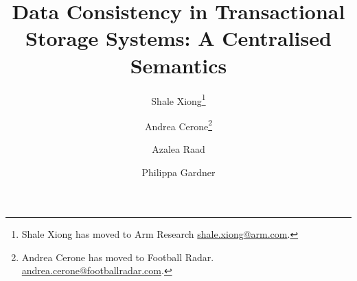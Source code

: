 \documentclass[a4paper,UKenglish,cleveref,autoref,thm-restate]{lipics-v2019}
\title{Data Consistency in Transactional Storage Systems: A Centralised Semantics}
\author{Shale Xiong\footnote{Shale Xiong has moved to Arm Research \url{shale.xiong@arm.com}.}}
       {Department of Computing, Imperial College London, UK}{shale.xiong14@ic.ac.uk}
       {[orcid]}
       {The Department of Computing, Imperial College London, and EPSRC Fellowship 'VeTSpec: Verified Trustworthy Software Specification' (EP/R034567/1)}
\author{Andrea Cerone\footnote{Andrea Cerone has moved to Football Radar. \url{andrea.cerone@footballradar.com}.}}
       {Department of Computing, Imperial College London, UK}
       {andrea.cerone@fic.ac.uk}
       {[orcid]}
       {EPSRC Programme Grant 'REMS: Rigorous Engineering for Mainstream Systems' (EP/K008528/1)}
\author{Azalea Raad}
       {MPI-SWS, Germany}
       {azalea@mpi-sws.org}
       {[orcid]}
       {[funding]}
\author{Philippa Gardner}
       {Department of Computing, Imperial College London, UK}
       {p.gardner@ic.ac.uk}
       {[orcid]}
       {EPSRC Programme Grant 'REMS: Rigorous Engineering for Mainstream Systems' (EP/K008528/1), and EPSRC Fellowship 'VeTSpec: Verified Trustworthy Software Specification' (EP/R034567/1)}
\newcommand{\RootPath}{.}
\begin{document}
\maketitle

\begin{abstract}

\end{abstract}










\appendix

\end{document}
